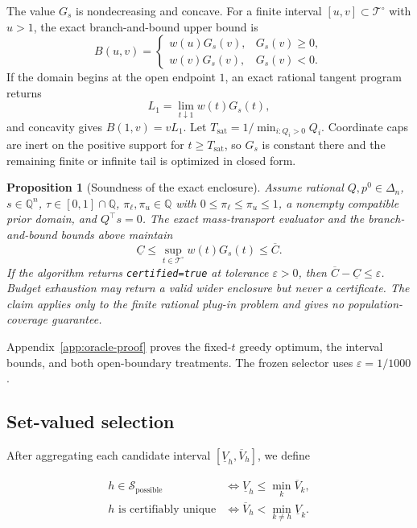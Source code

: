 \documentclass[preprint,review,12pt]{elsarticle}
\newtheorem{proposition}{Proposition}
\begin{document}
The value \(G_s\) is nondecreasing and concave. For a finite interval
\([u,v]\subset\mathcal{T}^{\circ}\) with \(u>1\), the exact branch-and-bound
upper bound is
\begin{equation}
B(u,v)=
\begin{cases}
w(u)G_s(v),&G_s(v)\geq0,\\
w(v)G_s(v),&G_s(v)<0.
\end{cases}
\label{eq:interval-upper}
\end{equation}
If the domain begins at the open endpoint \(1\), an exact rational tangent
program returns
\[
L_1=\lim_{t\downarrow1}w(t)G_s(t),
\]
and concavity gives \(B(1,v)=vL_1\). Let
\(T_{\mathrm{sat}}=1/\min_{i:Q_i>0}Q_i\). Coordinate caps are inert on the
positive support for \(t\geq T_{\mathrm{sat}}\), so \(G_s\) is constant there
and the remaining finite or infinite tail is optimized in closed form.

\begin{proposition}[Soundness of the exact enclosure]
\label{prop:exact-enclosure}
Assume rational \(Q,p^0\in\Delta_n\), \(s\in\mathbb{Q}^n\),
\(\tau\in[0,1]\cap\mathbb{Q}\),
\(\pi_\ell,\pi_u\in\mathbb{Q}\) with
\(0\leq\pi_\ell\leq\pi_u\leq1\), a nonempty compatible prior domain, and
\(Q^\top s=0\). The exact mass-transport evaluator and the
branch-and-bound bounds above maintain
\[
\underline C\leq
\sup_{t\in\mathcal{T}^{\circ}}w(t)G_s(t)
\leq\overline C.
\]
If the algorithm returns \texttt{certified=true} at tolerance
\(\varepsilon>0\), then
\(\overline C-\underline C\leq\varepsilon\). Budget exhaustion may return a
valid wider enclosure but never a certificate. The claim applies only to the
finite rational plug-in problem and gives no population-coverage guarantee.
\end{proposition}

Appendix~\ref{app:oracle-proof} proves the fixed-\(t\) greedy optimum, the
interval bounds, and both open-boundary treatments. The frozen selector uses
\(\varepsilon=1/1000\).

\subsection{Set-valued selection}

After aggregating each candidate interval
\([\underline V_h,\overline V_h]\), we define

\begin{align}
h\in\mathcal{S}_{\mathrm{possible}}
&\iff \underline V_h\leq\min_k\overline V_k,\\
h\text{ is certifiably unique}
&\iff \overline V_h<\min_{k\neq h}\underline V_k.
\end{align}
\end{document}
